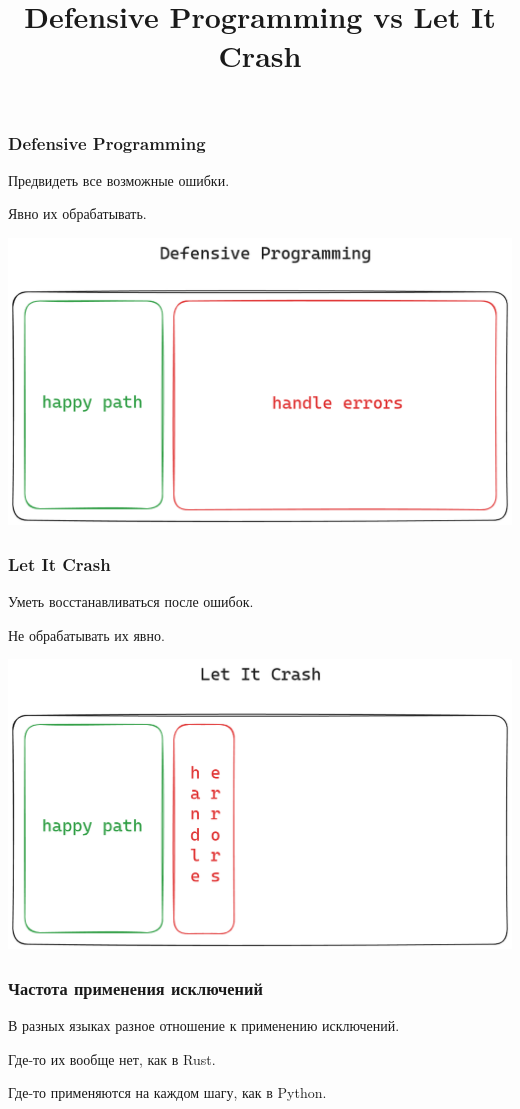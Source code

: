 \documentclass[10pt]{beamer}
\title{Defensive Programming vs Let It Crash}
\begin{document}
\begin{frame}
  \frametitle{Defensive Programming}
  Предвидеть все возможные ошибки.
  \par \bigskip
  Явно их обрабатывать.
\end{frame}

\begin{frame}
  \includegraphics[scale=0.29]{defensive-programming}
\end{frame}

\begin{frame}
  \frametitle{Let It Crash}
  Уметь восстанавливаться после ошибок.
  \par \bigskip
  Не обрабатывать их явно.
\end{frame}

\begin{frame}
  \includegraphics[scale=0.29]{let-it-crash}
\end{frame}

\begin{frame}
  \frametitle{Частота применения исключений}
  В разных языках разное отношение к применению исключений.
  \par \bigskip
  Где-то их вообще нет, как в Rust.
  \par \bigskip
  Где-то применяются на каждом шагу, как в Python.
\end{frame}
\end{document}
